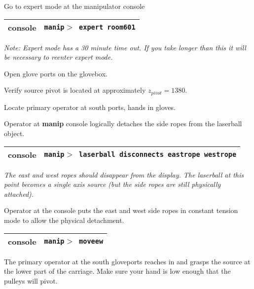   
\begin{enumerate}

\checkitem Go to expert mode at the manipulator console

  \begin{center}
  \begin{tabular}{|l|l|}
  \hline
  console & {\tt manip$>$ expert room601} \\
  \hline
  \end{tabular}
  \end{center}
  {\small\em Note: Expert mode has a 30 minute time out.  If 
   you take longer than this it will be necessary to reenter expert mode.}

\checkitem Open glove ports on the glovebox.

\checkitem Verify source pivot is located at approximately $z_{pivot}=1380$.

\checkitem Locate primary operator at south ports, hands in gloves.

\checkitem Operator at {\bf manip} console logically detaches the side ropes
  from the laserball object.
  \begin{center}
  \begin{tabular}{|l|l|}
  \hline
  console & {\tt manip$>$ laserball disconnects eastrope westrope} \\
  \hline
  \end{tabular}
  \end{center}
  \small
  {\em 
     The east and west ropes should disappear from the display.
    The laserball at this point becomes a single axis source
    (but the side ropes are still physically attached).
  }
  \normalsize


  
\checkitem Operator at the console puts the east and west side ropes
  in constant tension mode to allow the physical detachment.
  \begin{center}
  \begin{tabular}{|l|l|}
  \hline
  console & {\tt manip$>$ moveew} \\
  \hline
  \end{tabular}
  \end{center}




\checkitem The primary operator at the south gloveports reaches in and
grasps the source at the lower part of the  carriage. Make sure your
hand is low enough that the pulleys will pivot.


\end{enumerate}
